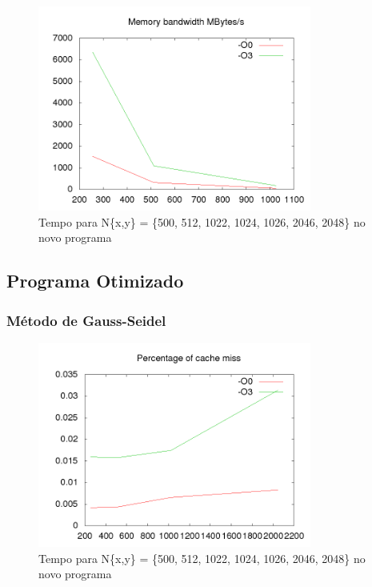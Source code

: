 \documentclass[12pt]{article}
\begin{document}
		\begin{figure}[ht!]
			\centering
			\includegraphics[width=90mm]{old_res_mem.png}
			\caption{Tempo para N\{x,y\} = \{500, 512, 1022, 1024, 1026, 2046, 2048\} no novo programa
			\label{overflow}}
		\end{figure}
		\newpage		
		
	\subsection{Programa Otimizado}
		\subsubsection{Método de Gauss-Seidel}
		\begin{figure}[ht!]
			\centering
			\includegraphics[width=90mm]{new_gs_cache.png}
			\caption{Tempo para N\{x,y\} = \{500, 512, 1022, 1024, 1026, 2046, 2048\} no novo programa
			\label{overflow}}
		\end{figure}
		\newpage
		
\end{document}
